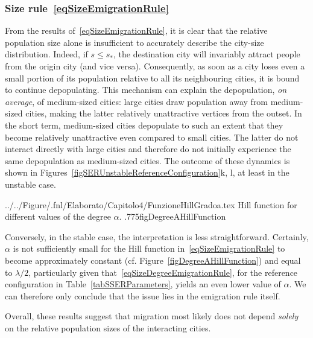 \documentclass[a4paper]{article}
\begin{document}
\subsubsection{Size rule~\texorpdfstring{\eqref{eqSizeEmigrationRule}}{}}
From the results of~\eqref{eqSizeEmigrationRule}, it is clear that the relative population size alone is insufficient to accurately describe the city-size distribution. Indeed, if $s\leq s_\ast$, the destination city will invariably attract people from the origin city (and vice versa). Consequently, as soon as a city loses even a small portion of its population relative to all its neighbouring cities, it is bound to continue depopulating. This mechanism can explain the depopulation, \textit{on average}, of medium-sized cities: large cities draw population away from medium-sized cities, making the latter relatively unattractive vertices from the outset. In the short term, medium-sized cities depopulate to such an extent that they become relatively unattractive even compared to small cities. The latter do not interact directly with large cities and therefore do not initially experience the same depopulation as medium-sized cities. The outcome of these dynamics is shown in Figures~\ref{figSERUnstableReferenceConfiguration}k, l, at least in the unstable case.

  {../../Figure/.fnl/Elaborato/Capitolo4/FunzioneHillGradoa.tex}
  {Hill function for different values of the degree $\alpha$.}
  {.775\linewidth}{figDegreeAHillFunction}

Conversely, in the stable case, the interpretation is less straightforward. Certainly, $\alpha$ is not sufficiently small for the Hill function in~\eqref{eqSizeEmigrationRule} to become approximately constant (cf. Figure~\ref{figDegreeAHillFunction}) and equal to $\lambda/2$, particularly given that~\eqref{eqSizeDegreeEmigrationRule}, for the reference configuration in Table~\ref{tabSSERParameters}, yields an even lower value of $\alpha$. We can therefore only conclude that the issue lies in the emigration rule itself.

Overall, these results suggest that migration most likely does not depend \textit{solely} on the relative population sizes of the interacting cities.
            
\end{document}
